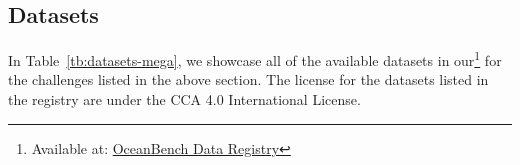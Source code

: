 


\subsection{Datasets} \label{sec:datasets}

In Table~\ref{tb:datasets-mega}, we showcase all of the available datasets in our\footnote{Available at: \href{https://github.com/quentinf00/oceanbench-data-registry}{OceanBench Data Registry}} for the challenges listed in the above section. The license for the datasets listed in the registry are under the CCA 4.0 International License.

